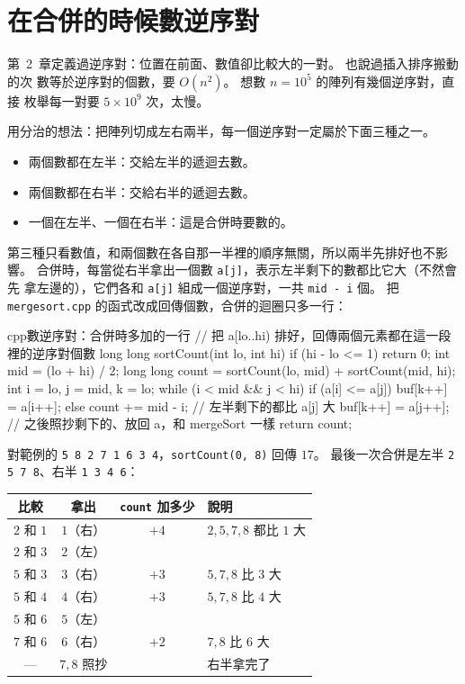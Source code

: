 \section{在合併的時候數逆序對}
\label{sec:rec-inversions}

第~2~章定義過逆序對：位置在前面、數值卻比較大的一對。 也說過插入排序搬動的次
數等於逆序對的個數，要 $O(n^2)$。 想數 $n = 10^5$ 的陣列有幾個逆序對，直接
枚舉每一對要 $5 \times 10^9$ 次，太慢。

用分治的想法：把陣列切成左右兩半，每一個逆序對一定屬於下面三種之一。

\begin{itemize}
\item 兩個數都在左半：交給左半的遞迴去數。
\item 兩個數都在右半：交給右半的遞迴去數。
\item 一個在左半、一個在右半：這是合併時要數的。
\end{itemize}

第三種只看數值，和兩個數在各自那一半裡的順序無關，所以兩半先排好也不影響。
合併時，每當從右半拿出一個數 \texttt{a[j]}，表示左半剩下的數都比它大（不然會先
拿左邊的），它們各和 \texttt{a[j]} 組成一個逆序對，一共 \texttt{mid - i} 個。
把 \texttt{mergesort.cpp} 的函式改成回傳個數，合併的迴圈只多一行：

\begin{code}{cpp}{數逆序對：合併時多加的一行}
// 把 a[lo..hi) 排好，回傳兩個元素都在這一段裡的逆序對個數
long long sortCount(int lo, int hi) {
    if (hi - lo <= 1) {
        return 0;
    }
    int mid = (lo + hi) / 2;
    long long count = sortCount(lo, mid) + sortCount(mid, hi);
    int i = lo, j = mid, k = lo;
    while (i < mid && j < hi) {
        if (a[i] <= a[j]) {
            buf[k++] = a[i++];
        } else {
            count += mid - i;            // 左半剩下的都比 a[j] 大
            buf[k++] = a[j++];
        }
    }
    // 之後照抄剩下的、放回 a，和 mergeSort 一樣
    return count;
}
\end{code}

對範例的 \texttt{5 8 2 7 1 6 3 4}，\texttt{sortCount(0, 8)} 回傳 $17$。 最後一次合併是左半 \texttt{2 5 7 8}、右半 \texttt{1 3 4 6}：

\begin{center}
\begin{tabular}{cccl}
\toprule
比較 & 拿出 & \texttt{count} 加多少 & 說明 \\
\midrule
$2$ 和 $1$ & $1$（右） & $+4$ & $2, 5, 7, 8$ 都比 $1$ 大 \\
$2$ 和 $3$ & $2$（左） & & \\
$5$ 和 $3$ & $3$（右） & $+3$ & $5, 7, 8$ 比 $3$ 大 \\
$5$ 和 $4$ & $4$（右） & $+3$ & $5, 7, 8$ 比 $4$ 大 \\
$5$ 和 $6$ & $5$（左） & & \\
$7$ 和 $6$ & $6$（右） & $+2$ & $7, 8$ 比 $6$ 大 \\
--- & $7, 8$ 照抄 & & 右半拿完了 \\
\bottomrule
\end{tabular}
\end{center}

